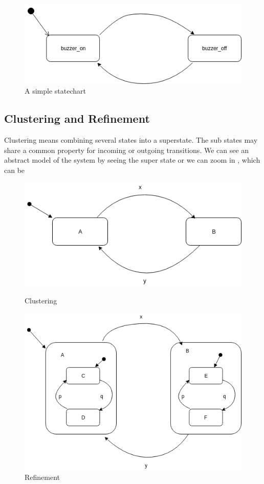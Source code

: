 \documentclass[16pt]{report}
\begin{document}
\begin{figure}[H]
\centering
\includegraphics[width=0.85\linewidth]{fig1.png}
\caption{A simple statechart}
\end{figure}

\subsection{Clustering and Refinement}
Clustering means combining several states into a superstate. The sub states may share a common property for incoming or outgoing transitions. We can see an abstract model of the system by seeing the super state or we can zoom in , which can be 



\begin{figure}[H]
\centering
\begin{minipage}{.5\textwidth}
  \centering
  \includegraphics[width=\linewidth]{fig2.png}
  \caption{Clustering}
  \label{fig:test1}
\end{minipage}%
\begin{minipage}{.5\textwidth}
  \centering
  \includegraphics[width=\linewidth]{fig3.png}
  \caption{Refinement}
  \label{fig:test2}
\end{minipage}
\end{figure}
\end{document}
